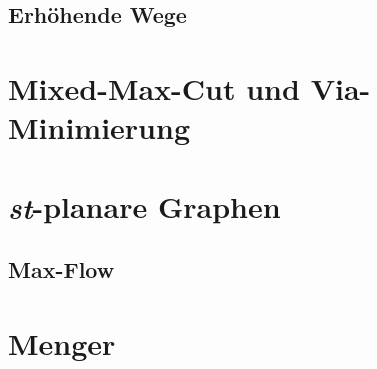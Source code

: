 \documentclass[10pt,a4paper]{article}
\begin{document}
\subsection{Erhöhende Wege}


\section{Mixed-Max-Cut und Via-Minimierung}


\section{\textit{st}-planare Graphen}
\subsection{Max-Flow}


\section{Menger}
\end{document}
